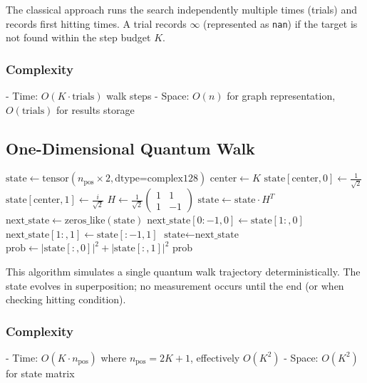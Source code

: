 \documentclass[12pt,a4paper]{article}
\begin{document}
The classical approach runs the search independently multiple times (trials) and records first hitting times. A trial records $\infty$ (represented as \texttt{nan}) if the target is not found within the step budget $K$.

\subsubsection{Complexity}
- Time: $O(K \cdot \text{trials})$ walk steps
- Space: $O(n)$ for graph representation, $O(\text{trials})$ for results storage

\subsection{One-Dimensional Quantum Walk}

\begin{algorithm}[H]
\caption{1D Quantum Random Walk}
\label{alg:1d_quantum}
\begin{algorithmic}[1]
    \State $\text{state} \gets \text{tensor}(n_{\text{pos}} \times 2, \text{dtype=complex128})$
    \State $\text{center} \gets K$
    \State $\text{state}[\text{center}, 0] \gets \frac{1}{\sqrt{2}}$
    \State $\text{state}[\text{center}, 1] \gets \frac{i}{\sqrt{2}}$
    \State $H \gets \frac{1}{\sqrt{2}}\begin{pmatrix} 1 & 1 \\ 1 & -1 \end{pmatrix}$
        \State {}
        \State $\text{state} \gets \text{state} \cdot H^T$
        \State {}
        \State $\text{next\_state} \gets \text{zeros\_like}(\text{state})$
        \State $\text{next\_state}[0:-1, 0] \gets \text{state}[1:, 0]$
        \State $\text{next\_state}[1:, 1] \gets \text{state}[:-1, 1]$
        \State $\text{state} \gets \text{next\_state}$
    \EndFor
    \State $\text{prob} \gets |\text{state}[:, 0]|^2 + |\text{state}[:, 1]|^2$
    \State \Return $\text{prob}$
    \EndProcedure
\end{algorithmic}
\end{algorithm}

This algorithm simulates a single quantum walk trajectory deterministically. The state evolves in superposition; no measurement occurs until the end (or when checking hitting condition).

\subsubsection{Complexity}
- Time: $O(K \cdot n_{\text{pos}})$ where $n_{\text{pos}} = 2K + 1$, effectively $O(K^2)$
- Space: $O(K^2)$ for state matrix
\end{document}
